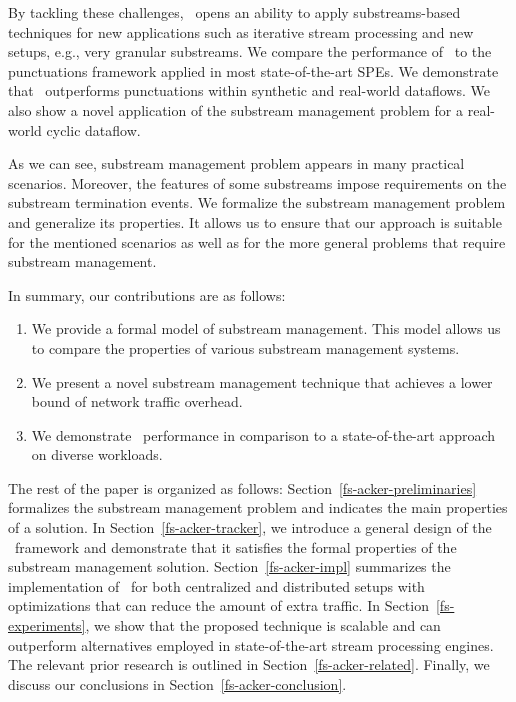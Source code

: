 By tackling these challenges, \tracker\ opens an ability to apply substreams-based techniques for new applications such as iterative stream processing and new setups, e.g., very granular substreams. We compare the performance of \tracker\ to the punctuations framework applied in most state-of-the-art SPEs. We demonstrate that \tracker\ outperforms punctuations within synthetic and real-world dataflows. We also show a novel application of the substream management problem for a real-world cyclic dataflow. 

As we can see, substream management problem appears in many practical scenarios. Moreover, the features of some substreams impose requirements on the substream termination events. We formalize the substream management problem and generalize its properties. It allows us to ensure that our approach is suitable for the mentioned scenarios as well as for the more general problems that require substream management.

In summary, our contributions are as follows:
\begin{enumerate}
    \item We provide a formal model of substream management. This model allows us to compare the properties of various substream management systems.
    \item We present a novel substream management technique that achieves a lower bound of network traffic overhead.
    \item We demonstrate \tracker\ performance in comparison to a state-of-the-art approach on diverse workloads.
\end{enumerate}

The rest of the paper is organized as follows: Section~\ref{fs-acker-preliminaries} formalizes the substream management problem and indicates the main properties of a solution. In Section~\ref{fs-acker-tracker}, we introduce a general design of the \tracker\ framework and demonstrate that it satisfies the formal properties of the substream management solution. Section~\ref{fs-acker-impl} summarizes the implementation of \tracker\ for both centralized and distributed setups with optimizations that can reduce the amount of extra traffic. In Section~\ref{fs-experiments}, we show that the proposed technique is scalable and can outperform alternatives employed in state-of-the-art stream processing engines. The relevant prior research is outlined in Section~\ref{fs-acker-related}. Finally, we discuss our conclusions in Section~\ref{fs-acker-conclusion}.